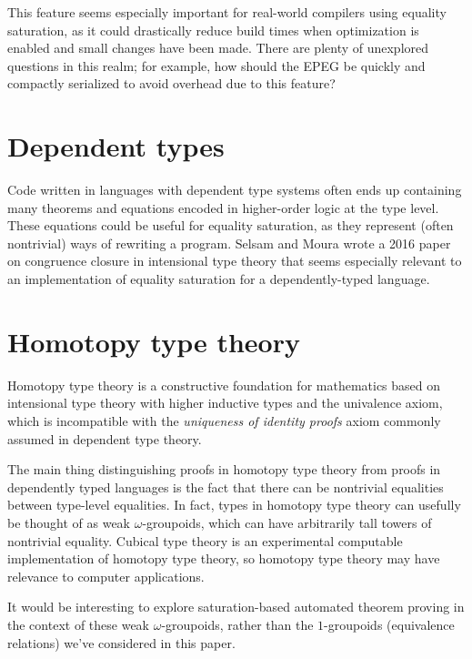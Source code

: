 \documentclass[11pt]{report}
\newcommand{\sfixme}[0]{%
  \begin{minipage}[c]{3.5em}%
  \todo[color=green!40,inline]{\textsc{fixme}}%
  \end{minipage}}
\begin{document}
This feature seems especially important for real-world compilers using equality
saturation, as it could drastically reduce build times when optimization is
enabled and small changes have been made. There are plenty of unexplored
questions in this realm; for example, how should the EPEG be quickly and
compactly serialized to avoid overhead due to this feature?

\section{Dependent types}
\label{sec:dependent-types}

Code written in languages with dependent type systems often ends up containing
many theorems and equations encoded in higher-order logic at the type level.
These equations could be useful for equality saturation, as they represent
(often nontrivial) ways of rewriting a program. Selsam and Moura wrote a 2016
paper \cite{selsam-2017} on congruence closure in intensional type theory that
seems especially relevant to an implementation of equality saturation for a
dependently-typed language.

\section{Homotopy type theory}
\label{sec:hott}

Homotopy type theory is a constructive foundation for mathematics based on
intensional type theory with higher inductive types and the univalence axiom,
which is incompatible with the \textit{uniqueness of identity proofs} axiom
commonly assumed in dependent type theory.

The main thing distinguishing proofs in homotopy type theory from proofs in
dependently typed languages is the fact that there can be nontrivial equalities
between type-level equalities. In fact, types in homotopy type theory can
usefully be thought of as weak $\omega$-groupoids, which can have arbitrarily
tall towers of nontrivial equality. Cubical type theory is an experimental
computable implementation of homotopy type theory, so homotopy type theory may
have relevance to computer applications.

It would be interesting to explore saturation-based automated theorem proving
in the context of these weak $\omega$-groupoids, rather than the $1$-groupoids
(equivalence relations) we've considered in this paper.

%
%
\end{document}
